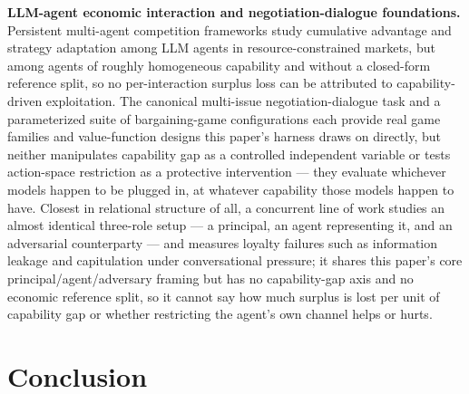 \documentclass[11pt]{article}
\begin{document}
\textbf{LLM-agent economic interaction and negotiation-dialogue foundations.} Persistent multi-agent competition frameworks \citep{CompeteAI} study cumulative advantage and strategy adaptation among LLM agents in resource-constrained markets, but among agents of roughly homogeneous capability and without a closed-form reference split, so no per-interaction surplus loss can be attributed to capability-driven exploitation. The canonical multi-issue negotiation-dialogue task \citep{DealOrNoDeal1706} and a parameterized suite of bargaining-game configurations \citep{GLEE2410} each provide real game families and value-function designs this paper's harness draws on directly, but neither manipulates capability gap as a controlled independent variable or tests action-space restriction as a protective intervention --- they evaluate whichever models happen to be plugged in, at whatever capability those models happen to have. Closest in relational structure of all, a concurrent line of work \citep{PrincipalLoyalty2606} studies an almost identical three-role setup --- a principal, an agent representing it, and an adversarial counterparty --- and measures loyalty failures such as information leakage and capitulation under conversational pressure; it shares this paper's core principal/agent/adversary framing but has no capability-gap axis and no economic reference split, so it cannot say how much surplus is lost per unit of capability gap or whether restricting the agent's own channel helps or hurts.

\section{Conclusion}
\end{document}
